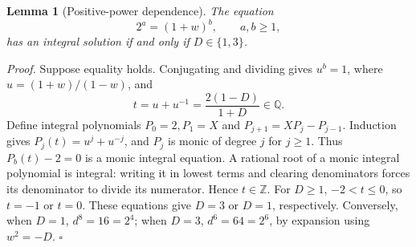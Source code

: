 \documentclass[11pt,letterpaper]{article}
\newcommand{\Z}{\mathbb{Z}}
\newcommand{\Q}{\mathbb{Q}}
\newtheorem{lemma}[theorem]{Lemma}
\newenvironment{proof}{\noindent\textit{Proof.}}{\hfill\(\square\)}
\begin{document}
\begin{lemma}[Positive-power dependence]
The equation
\[
2^a=(1+w)^b,\qquad a,b\ge1,
\]
has an integral solution if and only if \(D\in\{1,3\}\).
\end{lemma}
\begin{proof}
Suppose equality holds. Conjugating and dividing gives
\(u^b=1\), where \(u=(1+w)/(1-w)\), and
\[
t=u+u^{-1}=\frac{2(1-D)}{1+D}\in\Q.
\]
Define integral polynomials \(P_0=2,P_1=X\) and
\(P_{j+1}=XP_j-P_{j-1}\). Induction gives
\(P_j(t)=u^j+u^{-j}\), and \(P_j\) is monic of degree \(j\) for \(j\ge1\).
Thus \(P_b(t)-2=0\) is a monic integral equation.
A rational root of a monic integral polynomial is integral: writing
it in lowest terms and clearing denominators forces its denominator
to divide its numerator. Hence \(t\in\Z\).
For \(D\ge1\), \(-2<t\le0\), so \(t=-1\) or \(t=0\).
These equations give \(D=3\) or \(D=1\), respectively.
Conversely, when \(D=1\), \(d^8=16=2^4\); when \(D=3\),
\(d^6=64=2^6\), by expansion using \(w^2=-D\).
\end{proof}
\end{document}
